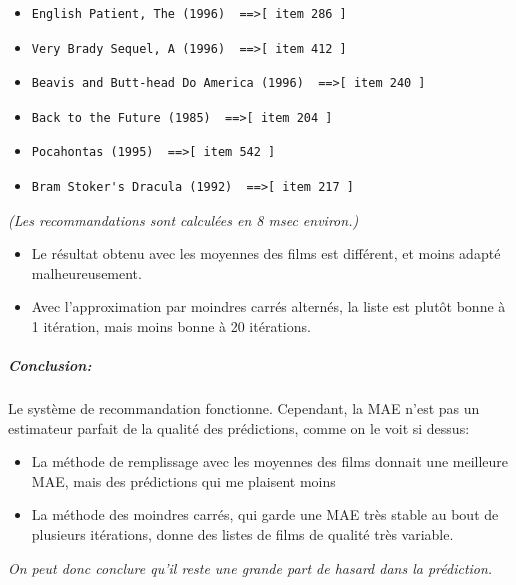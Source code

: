 \documentclass[12pt,a4paper]{article}
\begin{document}
\begin{itemize}
\item \begin{verbatim}English Patient, The (1996)  ==>[ item 286 ]\end{verbatim}
\item \begin{verbatim}Very Brady Sequel, A (1996)  ==>[ item 412 ]\end{verbatim}
\item \begin{verbatim}Beavis and Butt-head Do America (1996)  ==>[ item 240 ]\end{verbatim}
\item \begin{verbatim}Back to the Future (1985)  ==>[ item 204 ]\end{verbatim}
\item \begin{verbatim}Pocahontas (1995)  ==>[ item 542 ]\end{verbatim}
\item \begin{verbatim}Bram Stoker's Dracula (1992)  ==>[ item 217 ]\end{verbatim}
\end{itemize}
\vspace{1cm}
\textit{(Les recommandations sont calculées en 8 msec environ.)}\\
\begin{itemize}
\item Le résultat obtenu avec les moyennes des films est différent, et moins adapté malheureusement.
\item Avec l'approximation par moindres carrés alternés, la liste est plutôt bonne à 1 itération, mais moins bonne à 20 itérations.
\end{itemize}

\subparagraph{Conclusion:} Le système de recommandation fonctionne. Cependant, la MAE n'est pas un estimateur parfait de la qualité des prédictions, comme on le voit si dessus:\\

\begin{itemize}
\item La méthode de remplissage avec les moyennes des films donnait une meilleure MAE, mais des prédictions qui me plaisent moins
\item La méthode des moindres carrés, qui garde une MAE très stable au bout de plusieurs itérations, donne des listes de films de qualité très variable.
\end{itemize}

\textit{On peut donc conclure qu'il reste une grande part de hasard dans la prédiction.}
\end{document}
